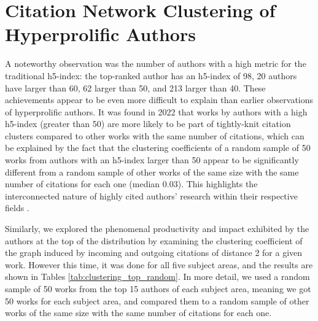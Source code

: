 \section{Citation Network Clustering of Hyperprolific Authors}

A noteworthy observation was the number of authors with a high metric for the
traditional h5-index: the top-ranked author has an h5-index of 98, 20 authors
have larger than 60, 62 larger than 50, and 213 larger than 40. These
achievements appear to be even more difficult to explain than earlier
observations of hyperprolific authors. It was found in 2022 that works by
authors with a high h5-index (greater than 50) are more likely to be part of
tightly-knit citation clusters compared to other works with the same number of
citations, which can be explained by the fact that the clustering coefficients
of a random sample of 50 works from authors with an h5-index larger than 50
appear to be significantly different from a random sample of other works of the
same size with the same number of citations for each one (median 0.03). This
highlights the interconnected nature of highly cited authors' research within
their respective fields \cite{Spi23g}.

Similarly, we explored the phenomenal productivity and impact exhibited by the
authors at the top of the distribution by examining the clustering coefficient
of the graph induced by incoming and outgoing citations of distance 2 for a
given work. However this time, it was done for all five subject areas, and the
results are shown in Tables \ref{tab:clustering_top_random}. In more detail, we
used a random sample of 50 works from the top 15 authors of each subject area,
meaning we got 50 works for each subject area, and compared them to a random
sample of other works of the same size with the same number of citations for
each one. %

